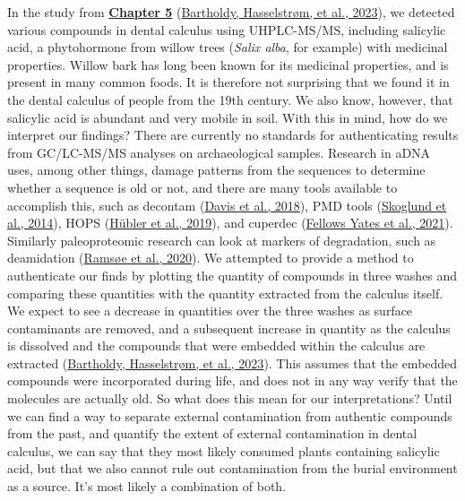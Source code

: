 \documentclass[
  letterpaper,
]{book}
\begin{document}
In the study from \protect\hyperlink{mb11CalculusPilot}{\textbf{Chapter
5}} (\protect\hyperlink{ref-bartholdyMultiproxyAnalysis2023}{Bartholdy,
Hasselstrøm, et al., 2023}), we detected various compounds in dental
calculus using UHPLC-MS/MS, including salicylic acid, a phytohormone
from willow trees (\emph{Salix alba}, for example) with medicinal
properties. Willow bark has long been known for its medicinal
properties, and is present in many common foods. It is therefore not
surprising that we found it in the dental calculus of people from the
19th century. We also know, however, that salicylic acid is abundant and
very mobile in soil. With this in mind, how do we interpret our
findings? There are currently no standards for authenticating results
from GC/LC-MS/MS analyses on archaeological samples. Research in aDNA
uses, among other things, damage patterns from the sequences to
determine whether a sequence is old or not, and there are many tools
available to accomplish this, such as decontam
(\protect\hyperlink{ref-Rdecontam}{Davis et al., 2018}), PMD tools
(\protect\hyperlink{ref-skoglundSeparatingEndogenous2014}{Skoglund et
al., 2014}), HOPS
(\protect\hyperlink{ref-hublerHOPSAutomated2019}{Hübler et al., 2019}),
and cuperdec (\protect\hyperlink{ref-yatesOralMicrobiome2021}{Fellows
Yates et al., 2021}). Similarly paleoproteomic research can look at
markers of degradation, such as deamidation
(\protect\hyperlink{ref-ramsoeDeamiDATESitespecific2020}{Ramsøe et al.,
2020}). We attempted to provide a method to authenticate our finds by
plotting the quantity of compounds in three washes and comparing these
quantities with the quantity extracted from the calculus itself. We
expect to see a decrease in quantities over the three washes as surface
contaminants are removed, and a subsequent increase in quantity as the
calculus is dissolved and the compounds that were embedded within the
calculus are extracted
(\protect\hyperlink{ref-bartholdyMultiproxyAnalysis2023}{Bartholdy,
Hasselstrøm, et al., 2023}). This assumes that the embedded compounds
were incorporated during life, and does not in any way verify that the
molecules are actually old. So what does this mean for our
interpretations? Until we can find a way to separate external
contamination from authentic compounds from the past, and quantify the
extent of external contamination in dental calculus, we can say that
they most likely consumed plants containing salicylic acid, but that we
also cannot rule out contamination from the burial environment as a
source. It's most likely a combination of both.
\end{document}
